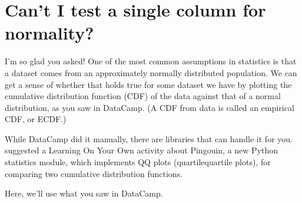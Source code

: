 \documentclass[letterpaper,10pt,english]{jupyterBook}
\begin{document}
\noindent{}


\section{Can’t I test a single column for normality?}
\label{\detokenize{chapter-10-visualization:can-t-i-test-a-single-column-for-normality}}
\sphinxAtStartPar
I’m so glad you asked!  One of the most common assumptions in statistics is that a dataset comes from an approximately normally distributed population.  We can get a sense of whether that holds true for some dataset we have by plotting the cumulative distribution function (CDF) of the data against that of a normal distribution, as you saw in DataCamp.  (A CDF from data is called an empirical CDF, or ECDF.)

\sphinxAtStartPar
While DataCamp did it manually, there are libraries that can handle it for you.  {\hyperref[\detokenize{chapter-9-math-and-stats::doc}]{}} suggested a Learning On Your Own activity about Pingouin, a new Python statistics module, which implements QQ plots (quartile\sphinxhyphen{}quartile plots), for comparing two cumulative distribution functions.

\sphinxAtStartPar
Here, we’ll use what you saw in DataCamp.
\end{document}
